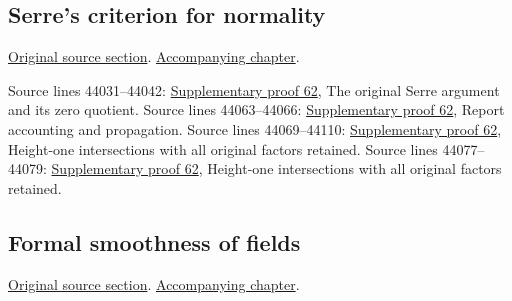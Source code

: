 \subsection{Serre's criterion for normality}
\hypertarget{algebra-source-section-serre-criterion}{}
\noindent\href{https://github.com/stacks/stacks-project/blob/a04446e57ec1fbc252a871afcec7752fb2807b14/algebra.tex\#L43865}{Original source section}. \href{algebra.pdf\#nameddest=section-serre-criterion}{Accompanying chapter}.

\begin{AlgebraSourceRoutes}
 Source lines 44031--44042: \hyperlink{algebra_serre_notes_20260929}{Supplementary proof 62}, The original Serre argument and its zero quotient.
 Source lines 44063--44066: \hyperlink{algebra_serre_notes_20260929}{Supplementary proof 62}, Report accounting and propagation.
 Source lines 44069--44110: \hyperlink{algebra_serre_notes_20260929}{Supplementary proof 62}, Height-one intersections with all original factors retained.
 Source lines 44077--44079: \hyperlink{algebra_serre_notes_20260929}{Supplementary proof 62}, Height-one intersections with all original factors retained.
\end{AlgebraSourceRoutes}

\subsection{Formal smoothness of fields}
\hypertarget{algebra-source-section-p-bases}{}
\noindent\href{https://github.com/stacks/stacks-project/blob/a04446e57ec1fbc252a871afcec7752fb2807b14/algebra.tex\#L44127}{Original source section}. \href{algebra.pdf\#nameddest=section-p-bases}{Accompanying chapter}.

